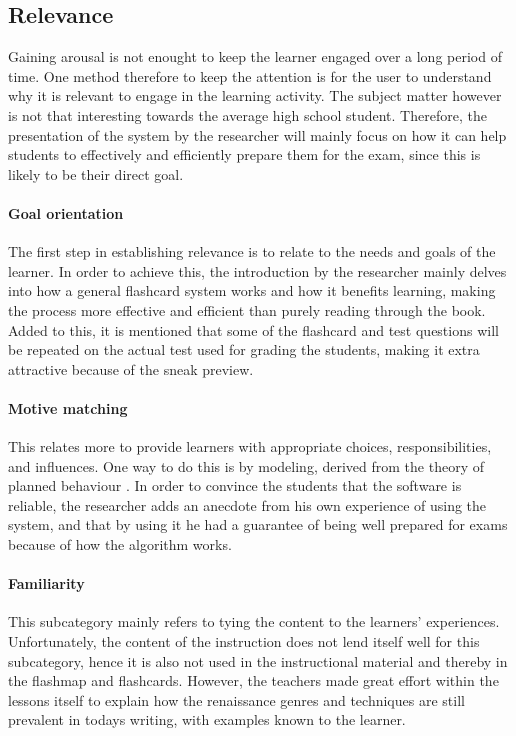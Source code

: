         \subsection{Relevance}

Gaining arousal is not enought to keep the learner engaged over a long period of time. One method therefore to keep the attention is for the user to understand why it is relevant to engage in the learning activity. The subject matter however is not that interesting towards the average high school student. Therefore, the presentation of the system by the researcher will mainly focus on how it can help students to effectively and efficiently prepare them for the exam, since this is likely to be their direct goal.

\paragraph{Goal orientation} The first step in establishing relevance is to relate to the needs and goals of the learner. In order to achieve this, the introduction by the researcher mainly delves into how a general flashcard system works and how it benefits learning, making the process more effective and efficient than purely reading through the book. Added to this, it is mentioned that some of the flashcard and test questions will be repeated on the actual test used for grading the students, making it extra attractive because of the sneak preview.

\paragraph{Motive matching} This relates more to provide learners with appropriate choices, responsibilities, and influences. One way to do this is by modeling, derived from the theory of planned behaviour \cite{theoryplannedbehaviour}. In order to convince the students that the software is reliable, the researcher adds an anecdote from his own experience of using the system, and that by using it he had a guarantee of being well prepared for exams because of how the algorithm works.

\paragraph{Familiarity} This subcategory mainly refers to tying the content to the learners' experiences. Unfortunately, the content of the instruction does not lend itself well for this subcategory, hence it is also not used in the instructional material and thereby in the flashmap and flashcards. However, the teachers made great effort within the lessons itself to explain how the renaissance genres and techniques are still prevalent in todays writing, with examples known to the learner.

